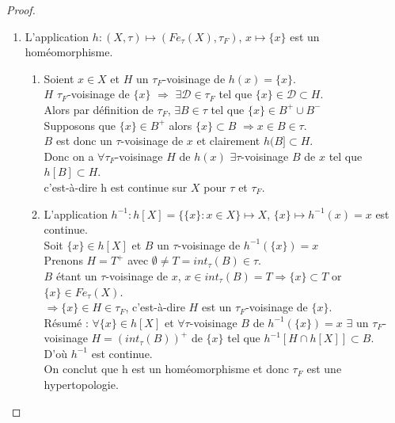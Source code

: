 \documentclass[11pt]{report}
\theoremstyle{styletheorem}
\theoremstyle{styledef}
\theoremstyle{remark}
\newcommand{\ie}{c'est-à-dire }
\newcommand{\Fe}{\ensuremath{Fe_{\tau}(X)}}
\begin{document}
\begin{proof}
\begin{enumerate}
		En résumé, $\forall G,H \in \mathcal{D}$ $\forall E \in G \cap H$ $\exists F \in \mathcal{D}$ tel que $E \in F \subset G \cap H$.\\ Ce qui nous permet de conclure, d'après \cite{b9}, que $\mathcal{D}$ est bien une base d'une topologie sur $\Fe$ et donc $\mathcal{B}$ en est une sous-base. Cette topologie sera notée $\tau_F$.
		\item L'application $h : (X,\tau) \longmapsto (\Fe, \tau_F)$, $x \mapsto \lbrace x \rbrace$ est un homéomorphisme.
		\begin{enumerate}
			\item  Soient $x \in X$ et $H$ un $\tau_F$-voisinage de $h(x) = \lbrace x \rbrace$.\\
			$H$ $\tau_F$-voisinage de $\lbrace x \rbrace$ $\Rightarrow $ $\exists \mathcal{D} \in \tau_F$ tel que $\lbrace x \rbrace \in \mathcal{D} \subset H$. \\
			Alors par définition de $\tau_F$, $\exists B \in \tau$ tel que $ \lbrace x \rbrace \in B^+ \cup B^-$\\
			Supposons que $\lbrace x \rbrace \in B^+$ alors $\lbrace x \rbrace \subset B$ $\Rightarrow x \in B \in \tau$.\\ $B$ est donc un $\tau$-voisinage de $x$ et clairement $h(B] \subset H$.\\
			Donc on a $\forall \tau_F$-voisinage $H$ de $h(x)$ $\exists \tau$-voisinage $B$ de $x$ tel que $h[B] \subset H$.\\ \ie  h est continue sur $X$ pour $\tau$ et $\tau_F$.
			\item L'application $h^{-1} : h[X] = \lbrace \lbrace x \rbrace :  x \in X \rbrace \longmapsto X$, $ \lbrace x \rbrace \mapsto h^{-1}({x}) = x $ est continue.\\
			Soit $\lbrace x \rbrace \in h[X]$ et $B$ un $\tau$-voisinage de $h^{-1}(\lbrace x \rbrace) = x$ \\
			Prenons $H = T^+$ avec $\emptyset \neq T = int_{\tau} (B) \in \tau$.\\
			$B$ étant un $\tau$-voisinage de $x$, $x \in int_{\tau} (B) = T \Rightarrow \lbrace x \rbrace \subset T $ or $\lbrace x \rbrace \in \Fe$.\\
			$\Rightarrow \lbrace x \rbrace \in H \in \tau_F$, \ie $H$ est un $\tau_F$-voisinage de $\lbrace x \rbrace$.\\
			Résumé : $\forall \lbrace x \rbrace \in h[X]$ et $\forall \tau$-voisinage $B$ de $h^{-1} (\lbrace x \rbrace)  = x $   $\exists$ un $\tau_F$-voisinage $H = (int_{\tau} (B))^+$  de $\lbrace x \rbrace$ tel que $h^{-1} [H \cap h[X]] \subset B$.\\
			D'où $h^{-1}$ est continue. \\
			On conclut que h est un homéomorphisme et donc $\tau_F$ est une hypertopologie.  
		\end{enumerate}
		
		
	\end{enumerate}
\end{proof}
\end{document}
